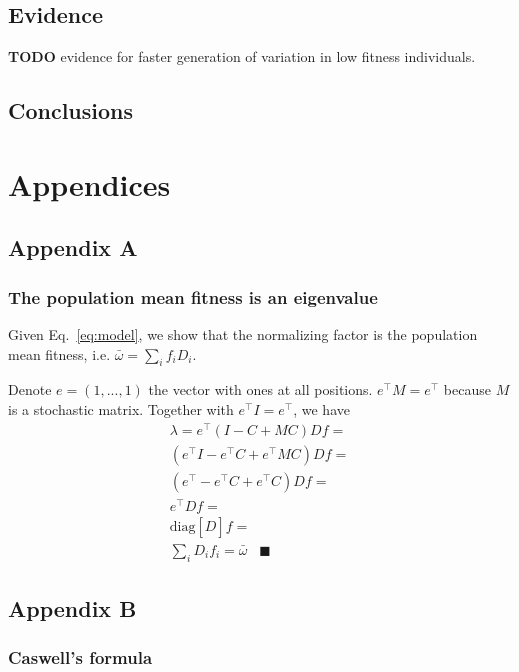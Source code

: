 \documentclass[a4paper,twocolumn]{article}   	%
\newcommand*{\tr}{^\intercal}
\newcommand{\matrx}[1]{{\left[ \stackrel{}{#1}\right]}}
\newcommand{\diag}[1]{\mbox{diag}\matrx{#1}}
\begin{document}
\subsection*{Evidence}

\textbf{TODO} evidence for faster generation of variation in low fitness individuals.

\subsection*{Conclusions}

\section*{Appendices}
\subsection*{Appendix A}\label{sec:AppA}
\subsubsection*{The population mean fitness is an eigenvalue}

Given Eq.~\ref{eq:model}, we show that the normalizing factor is the population mean fitness, i.e. $\bar{\omega} = \sum_i{f_i D_i}$.

Denote $e = (1, ..., 1)$ the vector with ones at all positions.
$e\tr M = e\tr$ because $M$ is a stochastic matrix. Together with $e\tr I = e\tr$,
we have
\begin{multline}\label{eq:mean_fitness}
\lambda = 
e\tr (I - C + M C) D f = \\
(e\tr I - e\tr C + e\tr M C) D f = \\
(e\tr - e\tr C + e\tr C) D f = \\
e\tr D f = \\
\diag{D} f = \\
\sum_i{D_i f_i} = \bar{\omega} \;\;\; \blacksquare
\end{multline}

\subsection*{Appendix B}\label{sec:AppB}
\subsubsection*{Caswell's formula}
\end{document}
